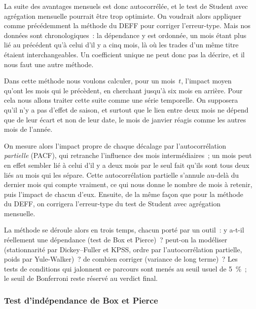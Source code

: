 La suite des avantages mensuels est donc autocorrélée, et le test de Student
avec agrégation mensuelle pourrait être trop optimiste.
On voudrait alors appliquer comme précédemment la méthode du DEFF pour corriger
l'erreur-type. Mais nos données sont chronologiques~: la dépendance y est
ordonnée, un mois étant plus lié au précédent qu'à celui d'il y a cinq mois,
là où les trades d'un même titre étaient interchangeables. Un coefficient
unique ne peut donc pas la décrire, et il nous faut une autre méthode.

Dans cette méthode nous voulons calculer, pour un mois~$t$, l'impact moyen
qu'ont les mois qui le précèdent, en cherchant jusqu'à six mois en arrière.
Pour cela nous allons traiter cette suite comme une série temporelle. On
supposera qu'il n'y a pas d'effet de saison, et surtout que le lien entre deux
mois ne dépend que de leur écart et non de leur date, le mois de janvier réagis 
comme les autres mois de l'année.

On mesure alors l'impact propre de chaque décalage par l'autocorrélation
\emph{partielle} (PACF), qui retranche l'influence des mois intermédiaires~; un
mois peut en effet sembler lié à celui d'il y a deux mois par le seul fait
qu'ils sont tous deux liés au mois qui les sépare. Cette autocorrélation
partielle s'annule au-delà du dernier mois qui compte vraiment, ce qui nous
donne le nombre de mois à retenir, puis l'impact de chacun d'eux. Ensuite, de
la même façon que pour la méthode du DEFF, on corrigera l'erreur-type du test
de Student avec agrégation mensuelle.

La méthode se déroule alors en trois temps, chacun porté par un outil~:
y a-t-il réellement une dépendance (test de Box et Pierce)~? peut-on la
modéliser (stationnarité par Dickey--Fuller et KPSS, ordre par
l'autocorrélation partielle, poids par Yule-Walker)~? de combien corriger
(variance de long terme)~? Les tests de conditions qui jalonnent ce parcours
sont menés au seuil usuel de 5~\%~; le seuil de Bonferroni reste réservé au
verdict final.

\subsubsection*{Test d'indépendance de Box et Pierce}

